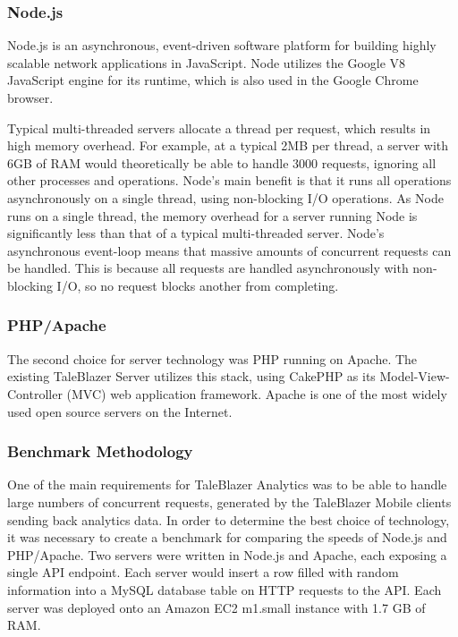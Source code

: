 \subsubsection{Node.js}

Node.js is an asynchronous, event-driven software platform for building highly scalable network applications in JavaScript. Node utilizes the Google V8 JavaScript engine for its runtime, which is also used in the Google Chrome browser. 

Typical multi-threaded servers allocate a thread per request, which results in high memory overhead. For example, at a typical 2MB per thread, a server with 6GB of RAM would theoretically be able to handle 3000 requests, ignoring all other processes and operations. Node's main benefit is that it runs all operations asynchronously on a single thread, using non-blocking I/O operations. As Node runs on a single thread, the memory overhead for a server running Node is significantly less than that of a typical multi-threaded server. Node's asynchronous event-loop means that massive amounts of concurrent requests can be handled. This is because all requests are handled asynchronously with non-blocking I/O, so no request blocks another from completing. \cite{site:event-loop}

\subsubsection{PHP/Apache}

The second choice for server technology was PHP running on Apache. The existing TaleBlazer Server utilizes this stack, using CakePHP as its Model-View-Controller (MVC) web application framework. Apache is one of the most widely used open source servers on the Internet.

\subsubsection{Benchmark Methodology}

One of the main requirements for TaleBlazer Analytics was to be able to handle large numbers of concurrent requests, generated by the TaleBlazer Mobile clients sending back analytics data. In order to determine the best choice of technology, it was necessary to create a benchmark for comparing the speeds of Node.js and PHP/Apache. Two servers were written in Node.js and Apache, each exposing a single API endpoint. Each server would insert a row filled with random information into a MySQL database table on HTTP requests to the API. 
Each server was deployed onto an Amazon EC2 m1.small instance with 1.7 GB of RAM. 

